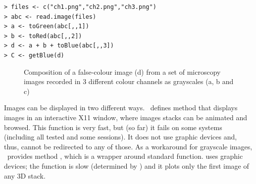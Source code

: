 \begin{verbatim}
> files <- c("ch1.png","ch2.png","ch3.png")
> abc <- read.image(files)
> a <- toGreen(abc[,,1])
> b <- toRed(abc[,,2])
> d <- a + b + toBlue(abc[,,3])
> C <- getBlue(d)
\end{verbatim}

\begin{figure}
\vspace*{.1in}
\begin{center}
\end{center}
\caption{\label{figure:channels}
    Composition of a false-colour image (d) from a set of microscopy images recorded in 3 different colour channels as grayscales (a, b and c)
}
\end{figure}

Images can be displayed in two different ways. \EBImage\ defines method  that displays images in an interactive X11 window, where images stacks can be animated and browsed. This function is very fast, but (so far) it fails on some systems (including all tested  and some  sessions). It does not use \R{} graphic devices and, thus, cannot be redirected to any of those. As a workaround for grayscale images, \EBImage\ provides method , which is a wrapper around standard \R{}  function.  uses \R{} graphic devices; the function is slow (determined by ) and it plots only the first image of any 3D stack.


